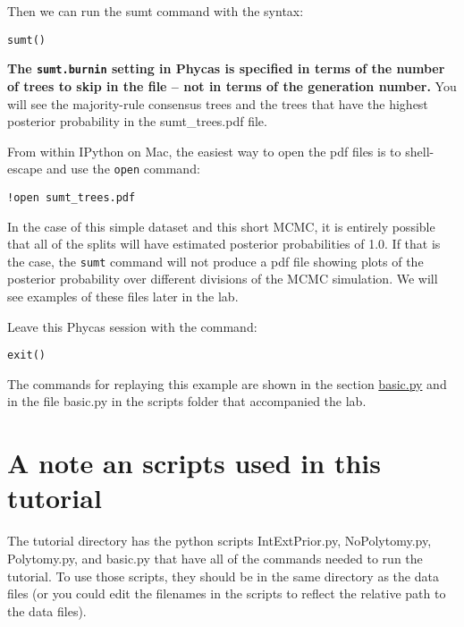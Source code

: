 \documentclass{article}
\newcommand{\cmd}[1]{\texttt{#1}\xspace}
\newcommand{\phycas}{Phycas\xspace}
\newcommand{\localfile}[1]{\textsf{#1}\xspace}
\begin{document}
Then we can run the sumt command with the syntax:
\begin{verbatim}
sumt()
\end{verbatim}
\textbf{The \cmd{sumt.burnin} setting in \phycas is specified in terms of the number of trees to skip in the file -- not in terms of the generation number.}
You will see the majority-rule consensus trees and the trees that have the 
highest posterior probability in the \localfile{sumt\_trees.pdf} file.

From within IPython on Mac, the easiest way to open the pdf files is to shell-escape and use the \cmd{open} command:
\begin{verbatim}
!open sumt_trees.pdf
\end{verbatim}


In the case of this simple dataset and this short MCMC, it is entirely possible that all of the 
splits will have estimated posterior probabilities of 1.0.
If that is the case, the \cmd{sumt} command will not produce a pdf file showing 
plots of the posterior probability over different divisions of the MCMC
simulation.
We will see examples of these files later in the lab.

Leave this \phycas session with the command:
\begin{verbatim}
exit()
\end{verbatim}
The commands for replaying this example are shown in the section \hyperref[basicpy]{basic.py} and in the file \localfile{basic.py} in the scripts folder that accompanied the lab.




\section{A note an scripts used in this tutorial}
The tutorial directory has the python
scripts \localfile{IntExtPrior.py}, \localfile{NoPolytomy.py},
\localfile{Polytomy.py}, and \localfile{basic.py}
that have all of the commands needed to run the tutorial.
To use those scripts, they should be in the same directory
as the data files (or you could edit the
filenames in the scripts to reflect the relative 
path to the data files).
\end{document}
